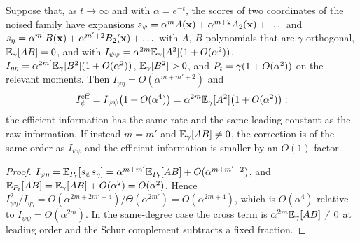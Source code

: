 \begin{proposition}
\label{prop:nuisance-degree}
Suppose that, as $t\to\infty$ and with $\alpha=e^{-t}$, the scores of two coordinates
of the noised family have expansions
$s_\psi=\alpha^mA(\mathbf{x})+\alpha^{m+2}A_2(\mathbf{x})+\dots$ and $s_\eta=\alpha^{m'}B(\mathbf{x})+\alpha^{m'+2}B_2(\mathbf{x})+\dots$
with $A$, $B$ polynomials that are $\gamma$-orthogonal, $\mathbb{E}_\gamma[AB]=0$, and with
$I_{\psi\psi}=\alpha^{2m}\mathbb{E}_\gamma[A^2](1+O(\alpha^2))$, $I_{\eta\eta}=\alpha^{2m'}\mathbb{E}_\gamma[B^2](1+O(\alpha^2))$,
$\mathbb{E}_\gamma[B^2]>0$, and $P_t=\gamma(1+O(\alpha^2))$ on the relevant moments. Then
$I_{\psi\eta}=O(\alpha^{m+m'+2})$ and
\begin{equation}
  I^{\mathrm{eff}}_\psi=I_{\psi\psi}\bigl(1+O(\alpha^4)\bigr)=\alpha^{2m}\mathbb{E}_\gamma[A^2]\bigl(1+O(\alpha^2)\bigr):
\end{equation}
the efficient information has the same rate and the same leading constant as the raw
information. If instead $m=m'$ and $\mathbb{E}_\gamma[AB]\ne0$, the correction is of the same
order as $I_{\psi\psi}$ and the efficient information is smaller by an $O(1)$ factor.
\end{proposition}
\begin{proof}
$I_{\psi\eta}=\mathbb{E}_{P_t}[s_\psi s_\eta]=\alpha^{m+m'}\mathbb{E}_{P_t}[AB]+O(\alpha^{m+m'+2})$, and
$\mathbb{E}_{P_t}[AB]=\mathbb{E}_\gamma[AB]+O(\alpha^2)=O(\alpha^2)$. Hence
$I_{\psi\eta}^2/I_{\eta\eta}=O(\alpha^{2m+2m'+4})/\Theta(\alpha^{2m'})=O(\alpha^{2m+4})$, which is
$O(\alpha^4)$ relative to $I_{\psi\psi}=\Theta(\alpha^{2m})$. In the same-degree case the
cross term is $\alpha^{2m}\mathbb{E}_\gamma[AB]\ne0$ at leading order and the Schur complement
subtracts a fixed fraction.
\end{proof}


